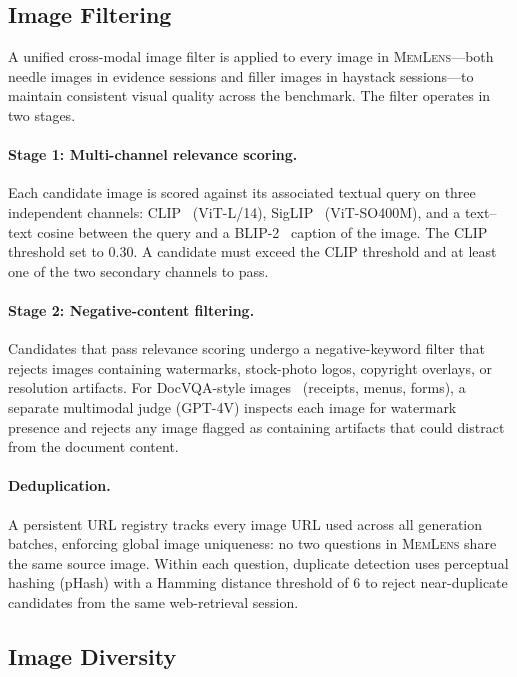\documentclass{llmxive}
\providecommand{\bench}{\textsc{MemLens}}
\begin{document}
\subsection{Image Filtering}
\label{app:image_filtering}

A unified cross-modal image filter is applied to every image in \bench{}---both needle images in evidence sessions and filler images in haystack sessions---to maintain consistent visual quality across the benchmark. The filter operates in two stages.

\paragraph{Stage 1: Multi-channel relevance scoring.}
Each candidate image is scored against its associated textual query on three independent channels: CLIP~\cite{radford2021learning} (ViT-L/14), SigLIP~\cite{zhai2023sigmoid} (ViT-SO400M), and a text--text cosine between the query and a BLIP-2~\cite{li2023blip2} caption of the image. The CLIP threshold set to 0.30. A candidate must exceed the CLIP threshold and at least one of the two secondary channels to pass.

\paragraph{Stage 2: Negative-content filtering.}
Candidates that pass relevance scoring undergo a negative-keyword filter that rejects images containing watermarks, stock-photo logos, copyright overlays, or resolution artifacts. For DocVQA-style images~\cite{mathew2021docvqa} (receipts, menus, forms), a separate multimodal judge (GPT-4V) inspects each image for watermark presence and rejects any image flagged as containing artifacts that could distract from the document content.

\paragraph{Deduplication.}
A persistent URL registry tracks every image URL used across all generation batches, enforcing global image uniqueness: no two questions in \bench{} share the same source image. Within each question, duplicate detection uses perceptual hashing (pHash) with a Hamming distance threshold of 6 to reject near-duplicate candidates from the same web-retrieval session.


\subsection{Image Diversity}
\label{app:image_diversity}
\end{document}
